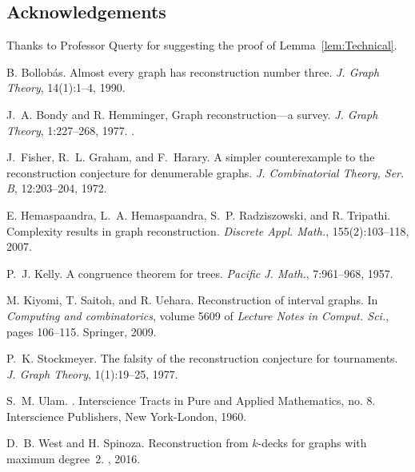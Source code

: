\documentclass[12pt]{article}
\begin{document}
\subsection*{Acknowledgements}

Thanks to Professor Querty for suggesting the proof of
Lemma~\ref{lem:Technical}.


\begin{thebibliography}{99}

 B. Bollob{\'a}s. \newblock Almost every
  graph has reconstruction number three. \newblock \emph{J. Graph Theory},
  14(1):1--4, 1990.

 J.~A. Bondy and R. Hemminger,
\newblock Graph reconstruction---a survey.
\emph{J. Graph Theory}, 1:227--268, 1977. .

 J.~Fisher, R.~L. Graham, and F.~Harary. \newblock A
  simpler counterexample to the reconstruction conjecture for
  denumerable graphs. \newblock \emph{J. Combinatorial Theory, Ser. B},
  12:203--204, 1972.

 E. Hemaspaandra, L.~A. Hemaspaandra,
  S.~P. Radziszowski, and R. Tripathi. \newblock
  Complexity results in graph reconstruction. \newblock \emph{Discrete
    Appl. Math.}, 155(2):103--118, 2007.

 P.~J. Kelly. \newblock A congruence theorem for
  trees. \newblock \emph{Pacific J. Math.}, 7:961--968, 1957.

 M. Kiyomi, T. Saitoh, and R. Uehara.
  \newblock Reconstruction of interval graphs. \newblock In 
    \emph{Computing and combinatorics}, volume 5609 of
    \emph{Lecture Notes in Comput. Sci.}, pages 106--115. Springer, 2009.

 P.~K. Stockmeyer. \newblock The falsity of the
  reconstruction conjecture for tournaments. \newblock \emph{J. Graph
    Theory}, 1(1):19--25, 1977.

 S.~M. Ulam. \newblock {}. \newblock Interscience Tracts in Pure and
  Applied Mathematics, no. 8.  Interscience Publishers, New
  York-London, 1960.
  
 D.~B. West and H. Spinoza.
 \newblock Reconstruction from $k$-decks for graphs with maximum degree~2.
 \newblock {}, 2016.

\end{thebibliography}
\end{document}
